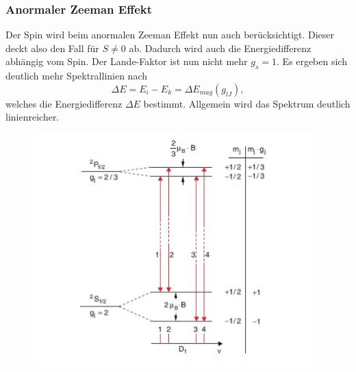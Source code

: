 \newpage \subsubsection{Anormaler Zeeman Effekt}
Der Spin wird beim anormalen Zeeman Effekt nun auch berücksichtigt. Dieser deckt also den Fall für $S\neq 0$ ab. Dadurch wird auch die Energiedifferenz abhängig vom Spin. Der Lande-Faktor ist nun nicht mehr $g_s=1$. Es ergeben sich deutlich mehr Spektrallinien nach 
\begin{equation}
    \Delta E=E_i-E_k=\Delta E_{mag}(g_{lJ}),
\end{equation}
 welches die Energiedifferenz $\Delta E$ bestimmt. Allgemein wird das Spektrum deutlich linienreicher.
\begin{figure}[H]
    \centering
    \captionsetup{justification=centering}
    \includegraphics[height=9cm]{"Anormaler_Zeeman.png"}
    \label{Fig:Anormal}
\end{figure}
